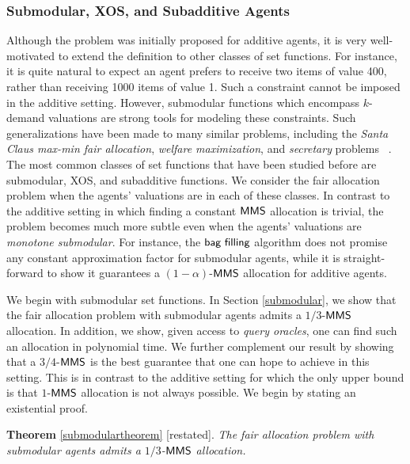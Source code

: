 \subsubsection{Submodular, XOS, and Subadditive Agents}
Although the problem was initially proposed for additive agents, it is very well-motivated to extend the definition to other classes of set functions. For instance, it is quite natural to expect an agent prefers to receive two items of value 400, rather than receiving 1000 items of value 1. Such a constraint cannot be imposed in the additive setting. However, submodular functions which encompass $k$-demand valuations are strong tools for modeling these constraints. Such generalizations have been made to many similar problems, including the \textit{Santa Claus max-min fair allocation}, \textit{welfare maximization}, and \textit{secretary} problems ~\cite{bateni2013submodular,feige2009maximizing,feige2011maximizing,golovin2005max}. The most common classes of set functions that have been studied before are submodular, XOS, and subadditive functions. We consider the fair allocation problem when the agents' valuations are in each of these classes. In contrast to the additive setting in which finding a constant $\mathsf{MMS}$ allocation is trivial, the problem becomes much more subtle even when the agents' valuations are \textit{monotone submodular}. For instance, the $\textsf{bag filling}$ algorithm does not promise any constant approximation factor for submodular agents, while it is straight-forward to show it guarantees a $(1-\alpha)$-$\mathsf{MMS}$ allocation for additive agents.


We begin with submodular set functions. In Section \ref{submodular}, we show that the fair allocation problem with submodular agents admits a $1/3$-$\mathsf{MMS}$ allocation. In addition, we show, given access to \textit{query oracles}, one can find such an allocation in polynomial time. We further complement our result by showing that a $3/4$-$\mathsf{MMS}$ is the best guarantee that one can hope to achieve in this setting. This is in contrast to the additive setting for which the only upper bound is that $1$-$\mathsf{MMS}$ allocation is not always possible. We begin by stating an existential proof.

\vspace{0.2cm}
{\noindent \textbf{Theorem} \ref{submodulartheorem} [restated]. \textit{The fair allocation problem with submodular agents admits a $1/3$-$\mathsf{MMS}$ allocation. 
 \\}}

